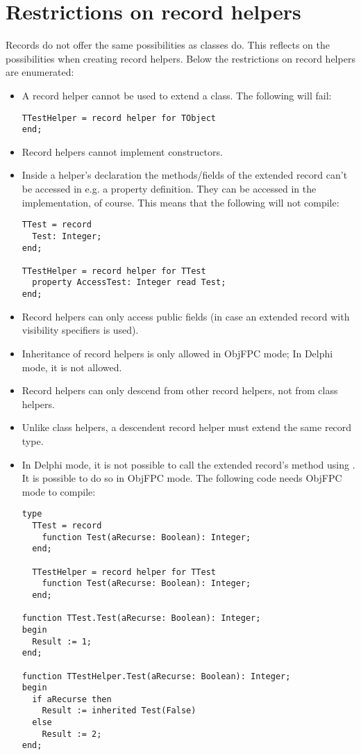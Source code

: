 \section{Restrictions on record helpers}
Records do not offer the same possibilities as classes do. This reflects on
the possibilities when creating record helpers. Below the restrictions on
record helpers are enumerated:
\begin{itemize}
\item A record helper cannot be used to extend a class. The following will
fail:
\begin{verbatim}
TTestHelper = record helper for TObject
end;
\end{verbatim}
\item Record helpers cannot implement constructors.
\item Inside a helper's declaration the methods/fields of the extended record
can't be accessed in e.g. a property definition. They can be accessed in the 
implementation, of course. This means that the following will not compile:
\begin{verbatim}
TTest = record
  Test: Integer;
end;

TTestHelper = record helper for TTest
  property AccessTest: Integer read Test;
end;
\end{verbatim}
\item Record helpers can only access public fields (in case an extended
record with visibility specifiers is used).
\item Inheritance of record helpers is only allowed in ObjFPC mode; In
Delphi mode, it is not allowed.
\item Record helpers can only descend from other record helpers, not from
class helpers.
\item Unlike class helpers, a descendent record helper must extend the same
record type.
\item In Delphi mode, it is not possible to call the extended record's
method using . It is possible to do so in ObjFPC mode. The
following code needs ObjFPC mode to compile:
\begin{verbatim}
type
  TTest = record
    function Test(aRecurse: Boolean): Integer;
  end;

  TTestHelper = record helper for TTest
    function Test(aRecurse: Boolean): Integer;
  end;

function TTest.Test(aRecurse: Boolean): Integer;
begin
  Result := 1;
end;

function TTestHelper.Test(aRecurse: Boolean): Integer;
begin
  if aRecurse then
    Result := inherited Test(False)
  else
    Result := 2;
end;
\end{verbatim}
\end{itemize}

